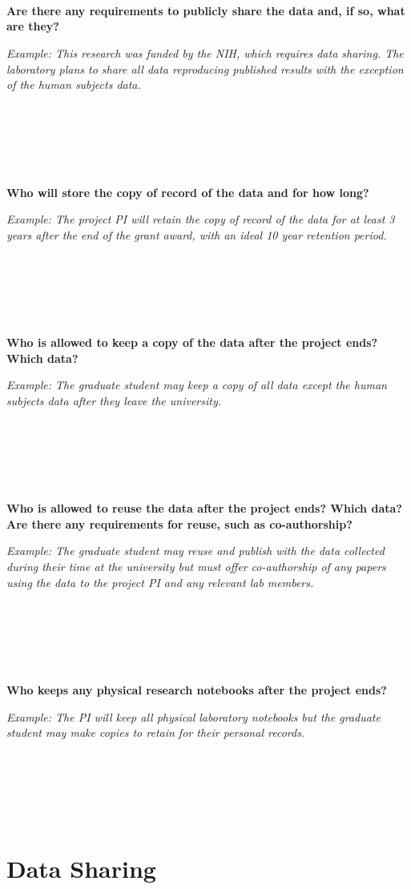 \documentclass[
]{book}
\begin{document}
~

~

~

\textbf{Are there any requirements to publicly share the data and, if so, what are they?}

\emph{Example: This research was funded by the NIH, which requires data sharing. The laboratory plans to share all data reproducing published results with the exception of the human subjects data.}

~

~

~

\textbf{Who will store the copy of record of the data and for how long?}

\emph{Example: The project PI will retain the copy of record of the data for at least 3 years after the end of the grant award, with an ideal 10 year retention period.}

~

~

~

\textbf{Who is allowed to keep a copy of the data after the project ends? Which data?}

\emph{Example: The graduate student may keep a copy of all data except the human subjects data after they leave the university.}

~

~

~

\textbf{Who is allowed to reuse the data after the project ends? Which data? Are there any requirements for reuse, such as co-authorship?}

\emph{Example: The graduate student may reuse and publish with the data collected during their time at the university but must offer co-authorship of any papers using the data to the project PI and any relevant lab members.}

~

~

~

\textbf{Who keeps any physical research notebooks after the project ends?}

\emph{Example: The PI will keep all physical laboratory notebooks but the graduate student may make copies to retain for their personal records.}

~

~

~

\hypertarget{data-sharing}{%
\chapter{Data Sharing}\label{data-sharing}}
\end{document}
